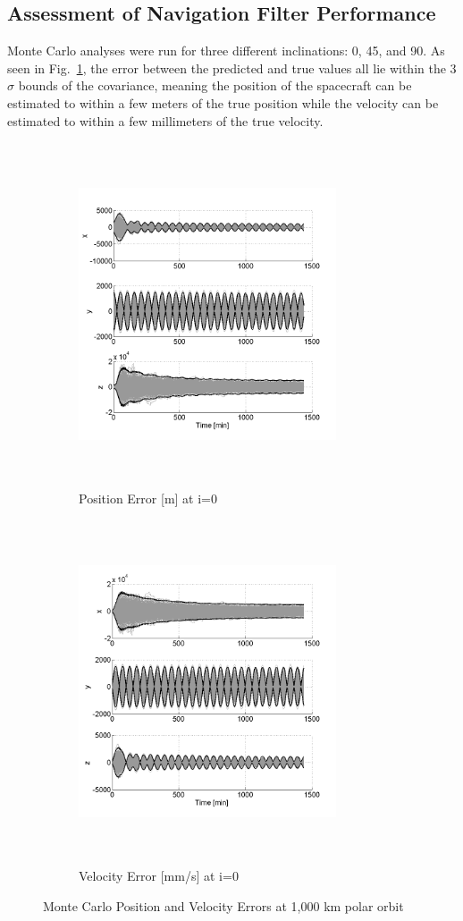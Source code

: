 \documentclass[]{aiaa-tc}%
\begin{document}
\subsection{Assessment of Navigation Filter Performance}
Monte Carlo analyses were run for three different inclinations: 0\degree, 45\degree, and 90\degree.  As seen in Fig.~\ref{fig:mcpos0}, the error between the predicted and true values all lie within the 3$\sigma$ bounds of the covariance, meaning the position of the spacecraft can be estimated to within a few meters of the true position while the velocity can be estimated to within a few millimeters of the true velocity.
\begin{figure}[t!]
\centering
\begin{subfigure}{.5\textwidth}
  \centering
  \includegraphics[height=4in,width=3in,keepaspectratio=false]{MC_pos0}
  \caption{Position Error [m] at i=0\degree}
  \label{fig:mcpos0}
\end{subfigure}%
\begin{subfigure}{.5\textwidth} 
  \centering
  \includegraphics[height=4in,width=3in,keepaspectratio=false]{MC_vel0}
  \caption{Velocity Error [mm/s] at i=0\degree}
  \label{fig:coastline}
\end{subfigure}
\caption{Monte Carlo Position and Velocity Errors at 1,000 km polar orbit}
\label{fig:mcvel0}
\end{figure}
\end{document}
